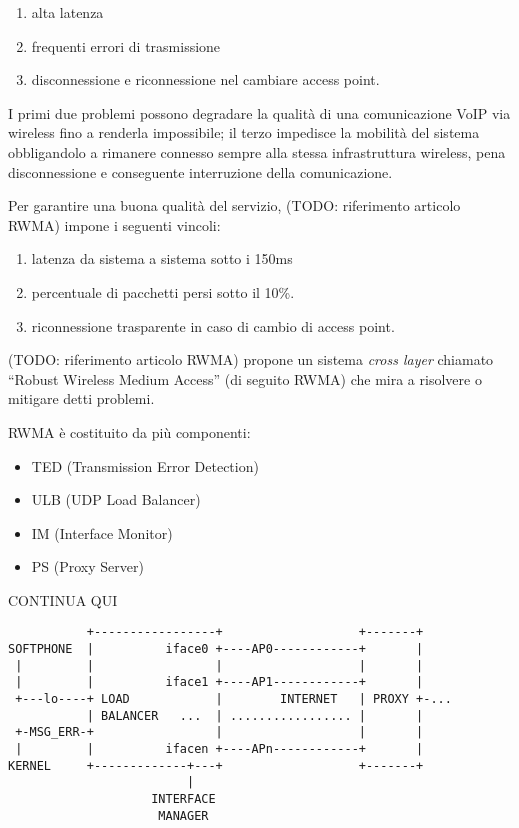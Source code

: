 \documentclass[12pt,a4paper,openright,twoside]{book}
\begin{document}
\begin{enumerate}
\item alta latenza
\item frequenti errori di trasmissione
\item disconnessione e riconnessione nel cambiare access point.
\end{enumerate}

I primi due problemi possono degradare la qualità di una comunicazione
VoIP via wireless fino a renderla impossibile; il terzo impedisce la
mobilità del sistema obbligandolo a rimanere connesso sempre alla
stessa infrastruttura wireless, pena disconnessione e conseguente
interruzione della comunicazione.

Per garantire una buona qualità del servizio, (TODO: riferimento
articolo RWMA) impone i seguenti vincoli:
\begin{enumerate}
\item latenza da sistema a sistema sotto i 150ms
\item percentuale di pacchetti persi sotto il 10\%.
\item riconnessione trasparente in caso di cambio di access point.
\end{enumerate}

(TODO: riferimento articolo RWMA) propone un sistema \emph{cross
  layer} chiamato ``Robust Wireless Medium Access'' (di seguito RWMA)
che mira a risolvere o mitigare detti problemi.

RWMA è costituito da più componenti:

\begin{itemize}
\item TED (Transmission Error Detection)
\item ULB (UDP Load Balancer)
\item IM (Interface Monitor)
\item PS (Proxy Server)
\end{itemize}

CONTINUA QUI

\begin{verbatim}
           +-----------------+                   +-------+
SOFTPHONE  |          iface0 +----AP0------------+       |
 |         |                 |                   |       |
 |         |          iface1 +----AP1------------+       |
 +---lo----+ LOAD            |        INTERNET   | PROXY +-...
           | BALANCER   ...  | ................. |       |
 +-MSG_ERR-+                 |                   |       |
 |         |          ifacen +----APn------------+       |
KERNEL     +-------------+---+                   +-------+
                         |
                    INTERFACE
                     MANAGER
\end{verbatim}
\end{document}

